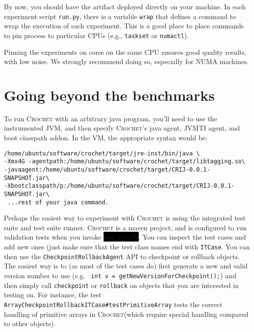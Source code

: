 \documentclass[12pt]{article}
\newcommand{\command}[1]{\colorbox{black}{\texttt{\color{white}#1}}}
\newcommand{\sysname}{\textsc{Crochet}\xspace}
\begin{document}
By now, you should have the artifact deployed directly on your machine.  In each
experiment script \texttt{run.py}, there is a variable \texttt{wrap} that
defines a command to wrap the execution of each experiment.  This is a good
place to place commands to pin process to particular CPUs (e.g.,
\texttt{taskset} or \texttt{numactl}).

Pinning the experiments on cores on the same CPU ensures good quality results,
with low noise.  We strongly recommend doing so, especially for NUMA machines.

\section{Going beyond the benchmarks}
To run \sysname with an arbitrary java program, you'll need to use the instrumented JVM, and then specify \sysname's java agent, JVMTI agent, and boot classpath addon. In the VM, the appropriate syntax would be:
\begin{verbatim}
/home/ubuntu/software/crochet/target/jre-inst/bin/java \
-Xmx4G -agentpath:/home/ubuntu/software/crochet/target/libtagging.so\
-javaagent:/home/ubuntu/software/crochet/target/CRIJ-0.0.1-SNAPSHOT.jar\
-Xbootclasspath/p:/home/ubuntu/software/crochet/target/CRIJ-0.0.1-SNAPSHOT.jar\
 ...rest of your java command.	
\end{verbatim}
 
 
 Perhaps the easiest way to experiment with \sysname is using the integrated test suite and test suite runner. \sysname is a maven project, and is configured to run validation tests when you invoke \command{mvn verify}. You can inspect the test cases and add new ones (just make sure that the test class names end with \texttt{ITCase}. You can then use the \texttt{CheckpointRollbackAgent} API to checkpoint or rollback objects. The easiest way is to (as most of the test cases do) first generate a new and valid version number to use (e.g. \texttt{		int v = getNewVersionForCheckpoint();}) and then simply call \texttt{checkpoint} or \texttt{rollback} on objects that you are interested in testing on. For instance, the test \texttt{ArrayCheckpointRollbackITCase\#testPrimitiveArray} tests the correct handling of primitive arrays in \sysname (which require special handling compared to other objects).
 
\end{document}
